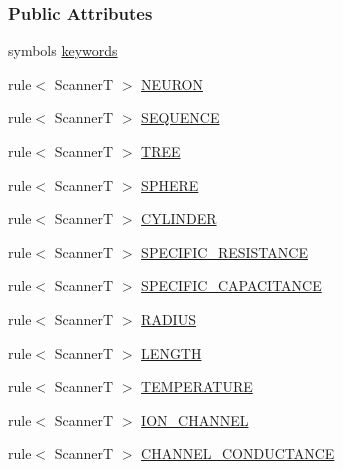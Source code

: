 \subsubsection*{Public Attributes}
\begin{DoxyCompactItemize}
\item 
symbols \hyperlink{struct_modigliani_model_format_grammar__t_1_1definition_ae3fe0c65888e077989c52e7a997482fc}{keywords}
\item 
rule$<$ ScannerT $>$ \hyperlink{struct_modigliani_model_format_grammar__t_1_1definition_ab3834162bbaa0ed71ea989dd197d71c3}{NEURON}
\item 
rule$<$ ScannerT $>$ \hyperlink{struct_modigliani_model_format_grammar__t_1_1definition_ad2bb9ea416129790af89bcfd41f1eb29}{SEQUENCE}
\item 
rule$<$ ScannerT $>$ \hyperlink{struct_modigliani_model_format_grammar__t_1_1definition_a940d7511a81287f27ab67c84f3b5ea58}{TREE}
\item 
rule$<$ ScannerT $>$ \hyperlink{struct_modigliani_model_format_grammar__t_1_1definition_a557e22a3240eea1ec8a4eaa00fd5ecfa}{SPHERE}
\item 
rule$<$ ScannerT $>$ \hyperlink{struct_modigliani_model_format_grammar__t_1_1definition_aae4797f15e74405cf710628cd5e888e8}{CYLINDER}
\item 
rule$<$ ScannerT $>$ \hyperlink{struct_modigliani_model_format_grammar__t_1_1definition_ad16cbaabc60421aa3711161c35b2ff4d}{SPECIFIC\_\-RESISTANCE}
\item 
rule$<$ ScannerT $>$ \hyperlink{struct_modigliani_model_format_grammar__t_1_1definition_aa01a6e3874fb2b6c046130a259f8ad19}{SPECIFIC\_\-CAPACITANCE}
\item 
rule$<$ ScannerT $>$ \hyperlink{struct_modigliani_model_format_grammar__t_1_1definition_a985aabd916cecfa92c7e62f9fe8941fe}{RADIUS}
\item 
rule$<$ ScannerT $>$ \hyperlink{struct_modigliani_model_format_grammar__t_1_1definition_ae8c8426598b804f2c02ee2b65a86a36e}{LENGTH}
\item 
rule$<$ ScannerT $>$ \hyperlink{struct_modigliani_model_format_grammar__t_1_1definition_a3ee9104d7ef1a622aa2279a23b545945}{TEMPERATURE}
\item 
rule$<$ ScannerT $>$ \hyperlink{struct_modigliani_model_format_grammar__t_1_1definition_af5d6dee13b542d524663213ad0044fe8}{ION\_\-CHANNEL}
\item 
rule$<$ ScannerT $>$ \hyperlink{struct_modigliani_model_format_grammar__t_1_1definition_a25bc14f17f64ff1ecb8a0848fbc8f7cd}{CHANNEL\_\-CONDUCTANCE}

\end{DoxyCompactItemize}
